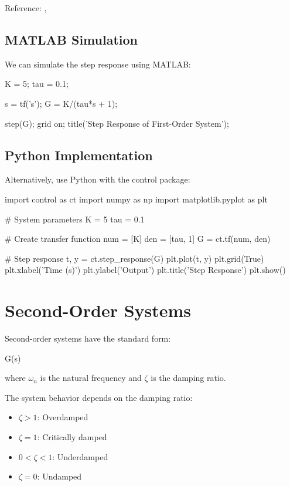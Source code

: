 \documentclass{../coursenotes}
\begin{document}
Reference: , 

\subsection{MATLAB Simulation}

We can simulate the step response using MATLAB:

\begin{matlab}[caption=First-Order System Simulation]
K = 5;
tau = 0.1;

s = tf('s');
G = K/(tau*s + 1);

step(G);
grid on;
title('Step Response of First-Order System');
\end{matlab}

\subsection{Python Implementation}

Alternatively, use Python with the control package:

\begin{python}[caption=Python Control System Analysis]
import control as ct
import numpy as np
import matplotlib.pyplot as plt

# System parameters
K = 5
tau = 0.1

# Create transfer function
num = [K]
den = [tau, 1]
G = ct.tf(num, den)

# Step response
t, y = ct.step_response(G)
plt.plot(t, y)
plt.grid(True)
plt.xlabel('Time (s)')
plt.ylabel('Output')
plt.title('Step Response')
plt.show()
\end{python}

\section{Second-Order Systems} \label{sec:secondorder}

Second-order systems have the standard form:

\begin{mathnumbered}
G(s) \eq {} \label{eq:secondorder}
\end{mathnumbered}

where $\omega_n$ is the natural frequency and $\zeta$ is the damping ratio.

The system behavior depends on the damping ratio:
\begin{itemize}
\item $\zeta > 1$: Overdamped
\item $\zeta = 1$: Critically damped
\item $0 < \zeta < 1$: Underdamped
\item $\zeta = 0$: Undamped
\end{itemize}
\end{document}
